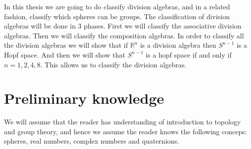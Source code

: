 \documentclass[../Thesis.tex]{subfile}
\begin{document}
In this thesis we are going to do classify division algebras, and in a related fashion, classify which spheres can be groups. The classification of division algebras will be done in 3 phases. First we will classify the associative division algebras. Then we will classify the composition algebras. In order to classify all the division algebras we will show that if $\mathbb{R}^n$ is a division algebra then $S^{n-1}$ is a Hopf space. And then we will show that $S^{n-1}$ is a hopf space if and only if $n = 1,2,4,8$. This allows us to classify the division algebras.
\section{Preliminary knowledge}
We will assume that the reader has understanding of introduction to topology and group theory, and hence we assume the reader knows the following conceps: spheres, real numbers, complex numbers and quaternions.
\end{document}
